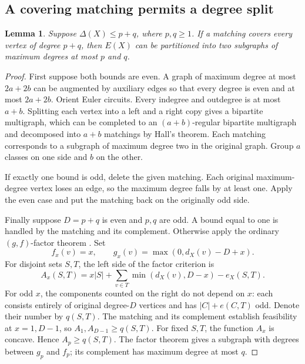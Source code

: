 \documentclass[11pt,a4paper]{article}
\newtheorem{lemma}[theorem]{Lemma}
\theoremstyle{definition}
\begin{document}
\subsection{A covering matching permits a degree split}
\begin{lemma}\label{lem:split}
Suppose $\Delta(X)\le p+q$, where $p,q\ge1$. If a matching covers every vertex of degree $p+q$, then $E(X)$ can be partitioned into two subgraphs of maximum degrees at most $p$ and $q$.
\end{lemma}
\begin{proof}
First suppose both bounds are even. A graph of maximum degree at most $2a+2b$ can be augmented by auxiliary edges so that every degree is even and at most $2a+2b$. Orient Euler circuits. Every indegree and outdegree is at most $a+b$. Splitting each vertex into a left and a right copy gives a bipartite multigraph, which can be completed to an $(a+b)$-regular bipartite multigraph and decomposed into $a+b$ matchings by Hall's theorem. Each matching corresponds to a subgraph of maximum degree two in the original graph. Group $a$ classes on one side and $b$ on the other.

If exactly one bound is odd, delete the given matching. Each original maximum-degree vertex loses an edge, so the maximum degree falls by at least one. Apply the even case and put the matching back on the originally odd side.

Finally suppose $D=p+q$ is even and $p,q$ are odd. A bound equal to one is handled by the matching and its complement. Otherwise apply the ordinary $(g,f)$-factor theorem \cite{lovasz}. Set
\[
f_x(v)=x,\qquad g_x(v)=\max(0,d_X(v)-D+x).
\]
For disjoint sets $S,T$, the left side of the factor criterion is
\[
A_x(S,T)=x|S|+\sum_{v\in T}\min(d_X(v),D-x)-e_X(S,T).
\]
For odd $x$, the components counted on the right do not depend on $x$: each consists entirely of original degree-$D$ vertices and has $|C|+e(C,T)$ odd. Denote their number by $q(S,T)$. The matching and its complement establish feasibility at $x=1,D-1$, so $A_1,A_{D-1}\ge q(S,T)$. For fixed $S,T$, the function $A_x$ is concave. Hence $A_p\ge q(S,T)$. The factor theorem gives a subgraph with degrees between $g_p$ and $f_p$; its complement has maximum degree at most $q$.
\end{proof}
\end{document}
